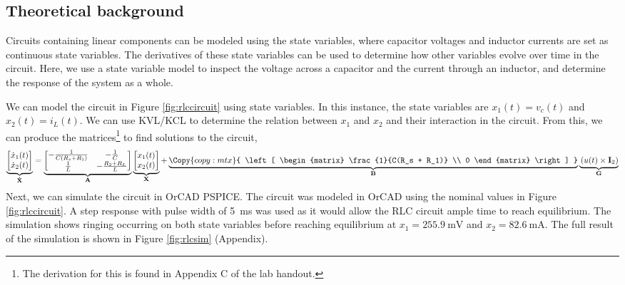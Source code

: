 \documentclass{report}
\begin{document}
\subsection{Theoretical background}
Circuits containing linear components can be modeled using the state variables, where capacitor voltages and inductor currents are set as continuous state variables. The derivatives of these state variables can be used to determine how other variables evolve over time in the circuit. Here, we use a state variable model to inspect the voltage across a capacitor and the current through an inductor, and determine the response of the system as a whole.

We can model the circuit in Figure \ref{fig:rlccircuit} using state variables. In this instance, the state variables are $x_1(t) = v_c(t)$  and $x_2(t) = i_L(t)$. We can use KVL/KCL to determine the relation between $x_1$ and $x_2$ and their interaction in the circuit. From this, we can produce the matrices\footnote{The derivation for this is found in Appendix C of the lab handout.} to find solutions to the circuit, \begin{equation}
	\underbrace{ \left[ \begin{matrix}
		\dot{x}_1(t) \\
		\dot{x}_2(t)
	\end{matrix} \right] }_{\mathbf{\dot{X}}}
	=
	\underbrace{ \left[
		\begin{matrix}
			-\frac{1}{C(R_s + R_1)} & -\frac{1}{C} \\
			\frac{1}{L} & -\frac{R_2 + R_L}{L}
		\end{matrix}
	\right] }_{\mathbf{A}}
	\underbrace{ \left[
		\begin{matrix}
			x_1(t) \\
			x_2(t)
		\end{matrix}
		\right]
	}_{\mathbf{X}}
	+
	\underbrace{
		\Copy{copy:mtx}{
			\left[ \begin{matrix}
				\frac{1}{C(R_s + R_1)} \\
				0
				\end{matrix}
			\right]
		}
	}_\mathbf{B}
	\underbrace{
		\vphantom{ \Paste{copy:mtx} }
		\left(
			u(t) \times
			\mathbf{I}_2
		\right)
	}_{\mathclap{\mathbf{G}}}
	\label{eq:poop}
\end{equation}
Next, we can simulate the circuit in OrCAD PSPICE. The circuit was modeled in OrCAD using the nominal values in Figure \ref{fig:rlccircuit}. A step response with pulse width of \SI{5}{\ms} was used as it would allow the RLC circuit ample time to reach equilibrium. The simulation shows ringing occurring on both state variables before reaching equilibrium at $x_1 = \SI{255.9}{\mV}$ and $x_2 = \SI{82.6}{\mA}$. The full result of the simulation is shown in Figure \ref{fig:rlcsim} (Appendix).
\end{document}
